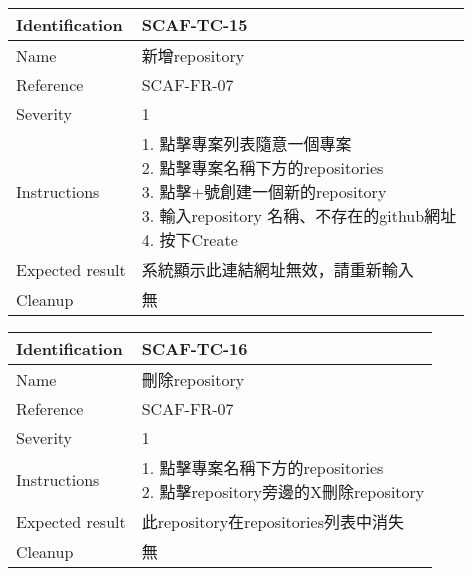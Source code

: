 \documentclass{report}
\begin{document}
\begin{tabularx}{0.9\textwidth}{
  |p{}%
  |p{}|%
  }
  \hline
  \centering Identification &  SCAF-TC-15 \\
  \hline
  \centering Name & 新增repository \\
  \hline
  \centering Reference & SCAF-FR-07 \\
  \hline
  \centering Severity & 1 \\
  \hline
  \centering Instructions & 
  \makecell{
    1. 點擊專案列表隨意一個專案 \\
    2. 點擊專案名稱下方的repositories \\
    3. 點擊+號創建一個新的repository \\
    3. 輸入repository 名稱、不存在的github網址  \\
    4. 按下Create
  }\\
  \hline
  \centering Expected result & 系統顯示此連結網址無效，請重新輸入 \\
  \hline
  \centering Cleanup & 無 \\
  \hline
\end{tabularx}
\newline\newline

\begin{tabularx}{0.9\textwidth}{
  |p{}%
  |p{}|%
  }
  \hline
  \centering Identification &  SCAF-TC-16 \\
  \hline
  \centering Name & 刪除repository \\
  \hline
  \centering Reference & SCAF-FR-07 \\
  \hline
  \centering Severity & 1 \\
  \hline
  \centering Instructions & 
  \makecell{
    1. 點擊專案名稱下方的repositories \\
    2. 點擊repository旁邊的X刪除repository \\
  }\\
  \hline
  \centering Expected result & 此repository在repositories列表中消失 \\
  \hline
  \centering Cleanup & 無 \\
  \hline
\end{tabularx}
\newline\newline
\end{document}
